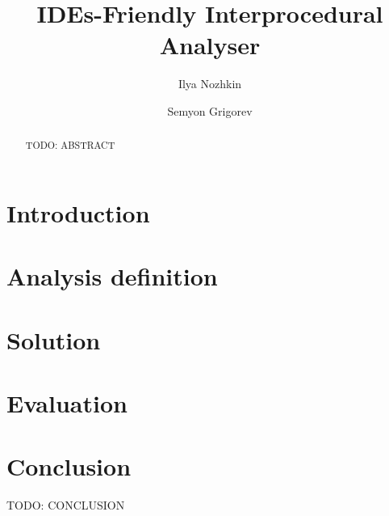 \documentclass[sigconf]{acmart}
\begin{document}
\title[IDEs-Friendly Interprocedural Analyser]{IDEs-Friendly Interprocedural Analyser}

\author{Ilya Nozhkin}

\author{Semyon Grigorev}

\begin{abstract}
TODO: ABSTRACT
\end{abstract}


\begin{CCSXML}
\end{CCSXML}



\maketitle

\section{Introduction}


\section{Analysis definition}


\section{Solution}


\section{Evaluation}


\section{Conclusion}
TODO: CONCLUSION


 
\end{document}
